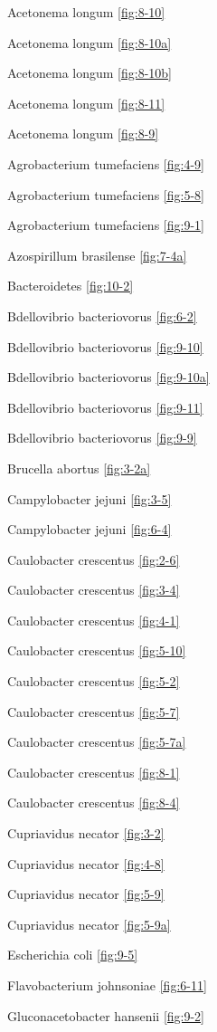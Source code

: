 \documentclass[]{tufte-book}
\begin{document}
Acetonema longum \ref{fig:8-10}

Acetonema longum \ref{fig:8-10a}

Acetonema longum \ref{fig:8-10b}

Acetonema longum \ref{fig:8-11}

Acetonema longum \ref{fig:8-9}

Agrobacterium tumefaciens \ref{fig:4-9}

Agrobacterium tumefaciens \ref{fig:5-8}

Agrobacterium tumefaciens \ref{fig:9-1}

Azospirillum brasilense \ref{fig:7-4a}

Bacteroidetes \ref{fig:10-2}

Bdellovibrio bacteriovorus \ref{fig:6-2}

Bdellovibrio bacteriovorus \ref{fig:9-10}

Bdellovibrio bacteriovorus \ref{fig:9-10a}

Bdellovibrio bacteriovorus \ref{fig:9-11}

Bdellovibrio bacteriovorus \ref{fig:9-9}

Brucella abortus \ref{fig:3-2a}

Campylobacter jejuni \ref{fig:3-5}

Campylobacter jejuni \ref{fig:6-4}

Caulobacter crescentus \ref{fig:2-6}

Caulobacter crescentus \ref{fig:3-4}

Caulobacter crescentus \ref{fig:4-1}

Caulobacter crescentus \ref{fig:5-10}

Caulobacter crescentus \ref{fig:5-2}

Caulobacter crescentus \ref{fig:5-7}

Caulobacter crescentus \ref{fig:5-7a}

Caulobacter crescentus \ref{fig:8-1}

Caulobacter crescentus \ref{fig:8-4}

Cupriavidus necator \ref{fig:3-2}

Cupriavidus necator \ref{fig:4-8}

Cupriavidus necator \ref{fig:5-9}

Cupriavidus necator \ref{fig:5-9a}

Escherichia coli \ref{fig:9-5}

Flavobacterium johnsoniae \ref{fig:6-11}

Gluconacetobacter hansenii \ref{fig:9-2}
\end{document}
